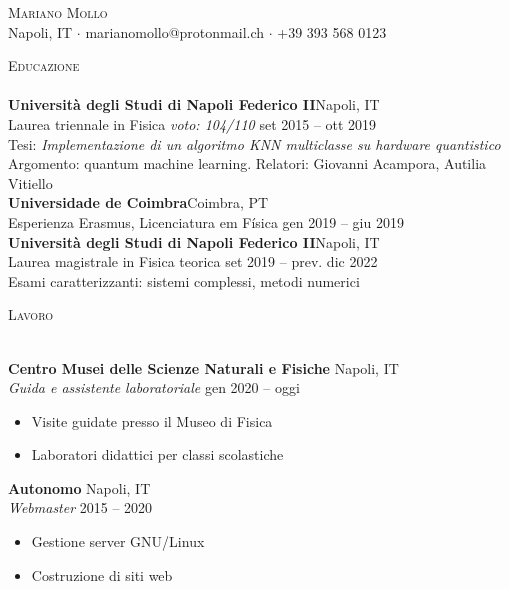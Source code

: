 \documentclass[a4paper]{article}
\newcommand{\lineunder} {
  \vspace*{-8pt} \\
  \hspace*{-18pt} \hrulefill \\
}
\newcommand{\header} [1] {
  {\hspace*{-18pt}\vspace*{6pt} \textsc{#1}}
  \vspace*{-6pt} \lineunder
}
\begin{document}
\vspace*{-40pt}

    

\vspace*{-10pt}
\begin{center}
  {\Huge \scshape {Mariano Mollo}}\\
  Napoli, IT $\cdot$ marianomollo@protonmail.ch $\cdot$ +39 393 568 0123\\
\end{center}

\header{Educazione}
\textbf{Università degli Studi di Napoli Federico II}\hfill Napoli, IT\\
Laurea triennale in Fisica \textit{voto: 104/110} \hfill set 2015 -- ott 2019\\
Tesi: \textit{Implementazione di un algoritmo KNN multiclasse su hardware quantistico}\\
Argomento: quantum machine learning.
Relatori: Giovanni Acampora, Autilia Vitiello\\
\vspace{2mm}
\textbf{Universidade de Coimbra}\hfill Coimbra, PT\\
Esperienza Erasmus, Licenciatura em Física \hfill gen 2019 -- giu 2019\\
\vspace{2mm}
\textbf{Università degli Studi di Napoli Federico II}\hfill Napoli, IT\\
Laurea magistrale in Fisica teorica \hfill set 2019 -- prev. dic 2022\\
Esami caratterizzanti: sistemi complessi, metodi numerici
\vspace{2mm}

\header{Lavoro}
\vspace{1mm}

\textbf{Centro Musei delle Scienze Naturali e Fisiche} \hfill Napoli, IT\\
\textit{Guida e assistente laboratoriale} \hfill gen 2020 -- oggi\\
\vspace{-1mm}
\begin{itemize} \itemsep 1pt
	\item Visite guidate presso il Museo di Fisica
	\item Laboratori didattici per classi scolastiche
\end{itemize}
\textbf{Autonomo} \hfill Napoli, IT\\
\textit{Webmaster} \hfill 2015 -- 2020\\
\vspace{-1mm}
\begin{itemize} \itemsep 1pt
  \item Gestione server GNU/Linux
  \item Costruzione di siti web
\end{itemize}
\end{document}
